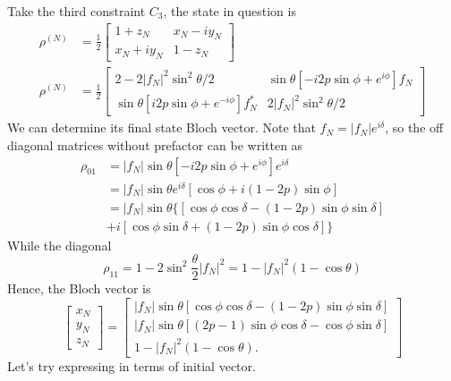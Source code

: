 \documentclass[../../../main.tex]{subfiles}
\begin{document}
Take the third constraint $C_3$, the state in question is
\begin{align*}
  \rho^{(N)}
   & =
  \frac12
  \begin{bmatrix}
    1+z_N    & x_N-iy_N \\
    x_N+iy_N & 1-z_N
  \end{bmatrix} \\
  \rho^{(N)}
   & = \frac{1 }{2}
  \begin{bmatrix}
    2- 2|f_N|^2\sin^2 \theta/2                                 & \sin \theta \left[-i2p \sin \phi + e^{i\phi}  \right]f_N \\
    \sin \theta \left[i2p \sin\phi + e^{-i\phi}  \right]f_N ^* & 2|f_N|^2 \sin ^2 \theta/2
  \end{bmatrix}
\end{align*}
We can determine its final state Bloch vector.
Note that $f_N = |f_N|e^{i\delta}$, so the off diagonal matrices without prefactor can be written as
\begin{align*}
  \rho_{01}
   & =
  |f_N|\sin\theta\left[-i2p\sin\phi+e^{i\phi}\right]e^{i\delta}    \\
   & =
  |f_N|\sin\theta e^{i\delta}\left[\cos\phi+i(1-2p)\sin\phi\right] \\
   & =
  |f_N|\sin\theta
  \big\{\left[\cos\phi\cos\delta-(1-2p)\sin\phi\sin\delta\right]   \\
   &
  +i\left[\cos\phi\sin\delta+(1-2p)\sin\phi\cos\delta
    \right]\big\}
\end{align*}
While the diagonal
\begin{equation*}
  \rho_{11} =
  1-2\sin ^2 \frac{\theta  }{2}|f_N|^2 =
  1-|f_N|^2(1-\cos \theta)
\end{equation*}
Hence, the Bloch vector is
\begin{equation*}
  \begin{bmatrix}
    x_N \\
    y_N \\
    z_N
  \end{bmatrix}
  =
  \begin{bmatrix}
    |f_N|\sin\theta
    \left[
      \cos\phi\cos\delta
      -(1-2p)\sin\phi\sin\delta
    \right] \\
    |f_N|\sin\theta
    \left[
      (2p-1)\sin\phi\cos\delta
      -\cos\phi\sin\delta
    \right] \\
    1-|f_N|^2(1-\cos\theta).
  \end{bmatrix}
\end{equation*}
Let's try expressing in terms of initial vector.
\end{document}
